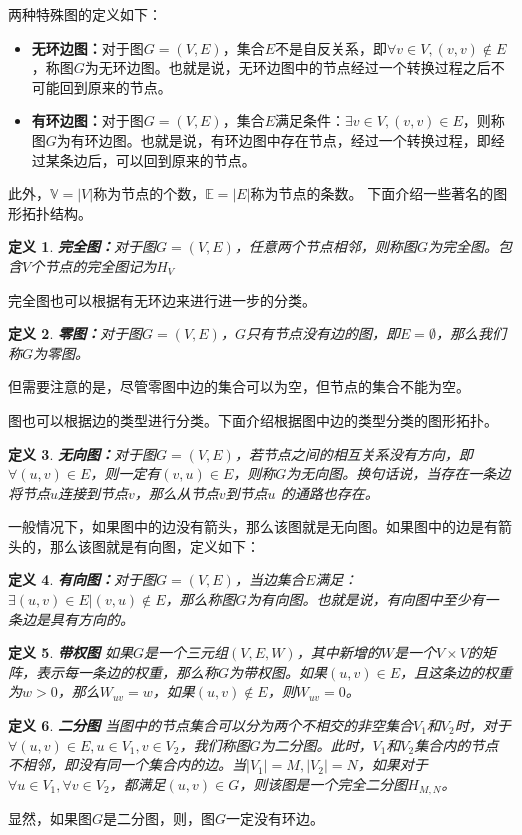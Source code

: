 \documentclass{ctexart}
\newtheorem{Definition}{\hspace{2em}定义}[section]
\begin{document}
                两种特殊图的定义如下：
                \begin{itemize}
                  \item \textbf{无环边图：}对于图$G=(V,E)$，集合$E$不是自反关系，即$\forall v\in V,(v,v) \notin E$，称图$G$为无环边图。也就是说，无环边图中的节点经过一个转换过程之后不可能回到原来的节点。
                  \item \textbf{有环边图：}对于图$G=(V,E)$，集合$E$满足条件：$\exists v \in V,(v,v)\in E$，则称图$G$为有环边图。也就是说，有环边图中存在节点，经过一个转换过程，即经过某条边后，可以回到原来的节点。
                \end{itemize}
                此外，$\mathbb{V}=|V|$称为节点的个数，$\mathbb{E}=|E|$称为节点的条数。
                下面介绍一些著名的图形拓扑结构。
                \begin{Definition}
                    \textbf{完全图：}对于图$G=(V,E)$，任意两个节点相邻，则称图$G$为完全图。包含$V$个节点的完全图记为$H_V$
                \end{Definition}
                完全图也可以根据有无环边来进行进一步的分类。
                \begin{Definition}
                    \textbf{零图：}对于图$G=(V,E)$，$G$只有节点没有边的图，即$E=\emptyset$，那么我们称$G$为零图。
                \end{Definition}
                但需要注意的是，尽管零图中边的集合可以为空，但节点的集合不能为空。

                图也可以根据边的类型进行分类。下面介绍根据图中边的类型分类的图形拓扑。
                \begin{Definition}
                    \textbf{无向图：}对于图$G=(V,E)$，若节点之间的相互关系没有方向，即$\forall (u,v) \in E$，则一定有$(v,u)\in E$，则称$G$为无向图。换句话说，当存在一条边将节点$u$连接到节点$v$，那么从节点$v$到节点$u$ 的通路也存在。
                \end{Definition}
                一般情况下，如果图中的边没有箭头，那么该图就是无向图。如果图中的边是有箭头的，那么该图就是有向图，定义如下：
                \begin{Definition}
                    \textbf{有向图：}对于图$G=(V,E)$，当边集合$E$满足：$\exists (u,v)\in E|(v,u)\notin E$，那么称图$G$为有向图。也就是说，有向图中至少有一条边是具有方向的。
                \end{Definition}
                \begin{Definition}
                    \textbf{带权图} 如果$G$是一个三元组$(V,E,W)$，其中新增的$W$是一个$V\times V$的矩阵，表示每一条边的权重，那么称$G$为带权图。如果$(u,v)\in E$，且这条边的权重为$w>0$，那么$W_{uv}=w$，如果$(u,v)\notin E$，则$W_{uv}=0$。
                \end{Definition}
                \begin{Definition}
                    \textbf{二分图} 当图中的节点集合可以分为两个不相交的非空集合$V_1$和$V_2$时，对于$\forall (u,v) \in E,u\in V_1,v\in V_2$，我们称图$G$为二分图。此时，$V_1$和$V_2$集合内的节点不相邻，即没有同一个集合内的边。当$|V_1|=M,|V_2|=N$，如果对于$\forall u \in V_1,\forall v \in V_2$，都满足$(u,v)\in G$，则该图是一个完全二分图$H_{M,N}$。
                \end{Definition}
                显然，如果图$G$是二分图，则，图$G$一定没有环边。
\end{document}
